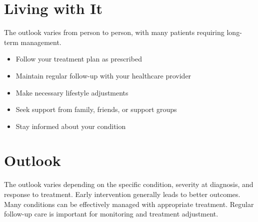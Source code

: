 \section{Living with It}
The outlook varies from person to person, with many patients requiring long-term management.

\begin{itemize}[noitemsep]
  \item Follow your treatment plan as prescribed
  \item Maintain regular follow-up with your healthcare provider
  \item Make necessary lifestyle adjustments
  \item Seek support from family, friends, or support groups
  \item Stay informed about your condition
\end{itemize}
\section{Outlook}
The outlook varies depending on the specific condition, severity at diagnosis, and response to treatment. Early intervention generally leads to better outcomes. Many conditions can be effectively managed with appropriate treatment. Regular follow-up care is important for monitoring and treatment adjustment.
